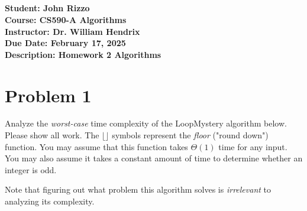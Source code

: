 \documentclass[12pt, letterpaper]{article}
\title{\classname \\ \assignmentdescription}
\author{\studentname}
\date{\duedate}
\newcommand{\studentname}          {John Rizzo           }
\newcommand{\classname}            {CS590-A Algorithms   }
\newcommand{\professorname}        {Dr. William Hendrix  }
\newcommand{\assignmentdescription}{Homework 2 Algorithms}
\newcommand{\duedate}              {February 17, 2025     }
\begin{document}
\noindent
\normalsize \textbf{Student:     \studentname} \\ [5pt]
            \textbf{Course:      \classname} \\ [5pt]
            \textbf{Instructor:  \professorname} \\ [5pt]
            \textbf{Due Date:    \duedate} \\ [5pt]
            \textbf{Description: \assignmentdescription}

\vspace{0.5cm}

\section*{Problem 1}

Analyze the \textit{worst-case} time complexity of the LoopMystery algorithm below.
Please show all work.  The $\lfloor \rfloor$ symbols represent the \textit{floor}
("round down") function. You may assume that this function takes $\Theta(1)$ time for any
input.  You may also assume it takes a constant amount of time to determine whether an
integer is odd.

\vspace{0.5cm}

\noindent
Note that figuring out what problem this algorithm solves is \textit{irrelevant} to analyzing its complexity.

\vspace{0.5cm}
\end{document}
